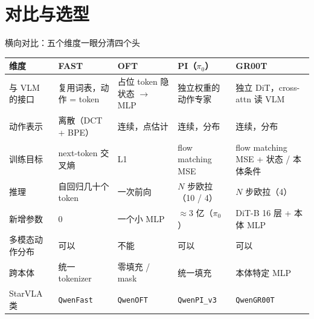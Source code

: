 \documentclass[aspectratio=169,10pt]{beamer}
\newcommand{\con}[1]{\textcolor{negative}{#1}}
\begin{document}
\section{对比与选型}
\begin{frame}{横向对比：五个维度一眼分清四个头}
  \begin{center}\footnotesize\setlength{\tabcolsep}{4pt}
  \begin{tabular}{p{2.3cm}p{2.5cm}p{2.5cm}p{2.9cm}p{2.9cm}}
    \toprule
    维度 & FAST & OFT & PI（$\pi_0$） & GR00T \\
    \midrule
    与 VLM 的接口 & 复用词表，动作 = token & 占位 token 隐状态 $\to$ MLP & 独立权重的动作专家 & 独立 DiT，cross-attn 读 VLM \\
    动作表示 & 离散（DCT + BPE） & 连续，点估计 & 连续，分布 & 连续，分布 \\
    训练目标 & next-token 交叉熵 & L1 & flow matching MSE & flow matching MSE + 状态 / 本体条件 \\
    推理 & 自回归几十个 token & 一次前向 & $N$ 步欧拉（10 / 4） & $N$ 步欧拉（4） \\
    新增参数 & 0 & 一个小 MLP & $\approx$3 亿（$\pi_0$） & DiT-B 16 层 + 本体 MLP \\
    多模态动作分布 & 可以 & \con{不能} & 可以 & 可以 \\
    跨本体 & 统一 tokenizer & 零填充 / mask & 统一填充 & 本体特定 MLP \\
    StarVLA 类 & \texttt{QwenFast} & \texttt{QwenOFT} & \texttt{QwenPI\_v3} & \texttt{QwenGR00T} \\
    \bottomrule
  \end{tabular}
  \end{center}
\end{frame}
\end{document}
